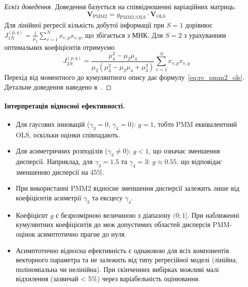 \documentclass[12pt,a4paper]{article}
\begin{document}
\begin{proof}[Ескіз доведення]
Доведення базується на співвідношенні варіаційних матриць:
\begin{equation}
\mathbf{V}_{\text{PMM2}} = g_{\text{PMM2/OLS}} \cdot \mathbf{V}_{\text{OLS}}
\end{equation}
Для лінійної регресії кількість добутої інформації при $S=1$ дорівнює $J_{1N}^{(p,q)} = \frac{1}{\mu_2}\sum_{v=1}^{N} x_{v,p} x_{v,q}$, що збігається з МНК. Для $S=2$ з урахуванням оптимальних коефіцієнтів отримуємо
\begin{equation}
J_{2N}^{(p,q)} = \frac{\mu_4^2 - \mu_2\mu_4}{\mu_2(\mu_4^2 - \mu_2\mu_4 + \mu_3^2)} \sum_{v=1}^{N} x_{v,p} x_{v,q}
\end{equation}
Перехід від моментного до кумулянтного опису дає формулу~\eqref{eq:re_pmm2_ols}. Детальне доведення наведено в~\cite{kunchenko2002polynomial}.
\end{proof}

\paragraph{Інтерпретація відносної ефективності.}

\begin{itemize}
    \item Для гаусових інновацій ($\gamma_3 = 0$, $\gamma_4 = 0$): $g = 1$, тобто PMM еквівалентний OLS, оскільки оцінки співпадають.

    \item Для асиметричних розподілів ($\gamma_3 \neq 0$): $g < 1$, що означає зменшення дисперсії. Наприклад, для $\gamma_3 = 1.5$ та $\gamma_4 = 3$: $g \approx 0.55$, що відповідає зменшенню дисперсії на 45\%.

    \item При використанні PMM2 відносне зменшення дисперсії залежить лише від коефіцієнтів асиметрії $\gamma_3$ та ексцесу $\gamma_4$.

    \item Коефіцієнт $g$ є безрозмірною величиною з діапазону $(0;1]$. При наближенні кумулянтних коефіцієнтів до меж допустимих областей дисперсія PMM-оцінок асимптотично прагне до нуля.

    \item Асимптотично відносна ефективність є однаковою для всіх компонентів векторного параметра та не залежить від типу регресійної моделі (лінійна, поліноміальна чи нелінійна). При скінченних вибірках можливі малі відхилення (зазвичай < 5\%) через варіабельність оцінювання.
\end{itemize}
\end{document}
